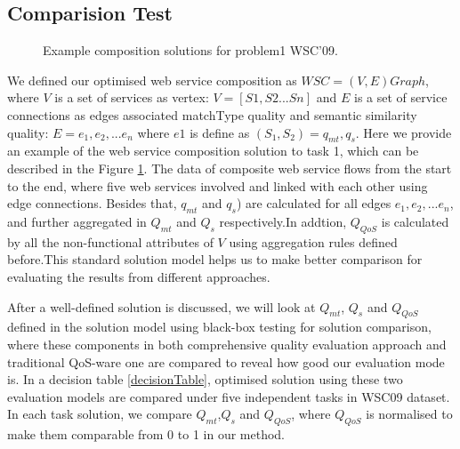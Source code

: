 \documentclass{llncs}
\begin{document}
\subsection{Comparision Test}\label{comparisionTest}
\begin{figure}[h]
\centerline{
}
 \caption{Example composition solutions for problem1 WSC'09.}
 \label{wscs}
\end{figure}
We defined our optimised web service composition as $WSC = (V, E)Graph$, where $V$ is a set of services as vertex: $V=[S1, S2...Sn]$ and $E$ is a set of service connections as edges associated matchType quality and semantic similarity quality: $E = {e_{1}, e_{2},... e_{n}}$ where $e1$ is define as $(S_{1},S_{2})={q_{mt}, q_{s}}$. Here we provide an example of the web service composition solution to task 1, which can be described in the Figure \ref{wscs}. The data of composite web service flows from the start to the end, where five web services involved and linked with each other using edge connections. Besides that, $q_{mt}$ and $q_{s}$) are calculated for all edges ${e_{1}, e_{2},... e_{n}}$, and further aggregated in $Q_{mt}$ and $Q_{s}$ respectively.In addtion, $Q_{QoS}$ is calculated by all the non-functional attributes of $V$ using aggregation rules defined before.This standard solution model helps us to make better comparison for evaluating the results from different approaches.

After a well-defined solution is discussed, we will look at $Q_{mt}$, $Q_{s}$ and $Q_{QoS}$ defined in the solution model using black-box testing for solution comparison, where these components in both comprehensive quality evaluation approach and traditional QoS-ware one \cite{feng2013dynamic,huang2009effective,ma2015hybrid,da2014graph} are compared to reveal how good our evaluation mode is. In a decision table \ref{decisionTable}, optimised solution using these two evaluation models are compared under five independent tasks in WSC09 dataset. In each task solution, we compare $Q_{mt}$,$Q_{s}$ and $Q_{QoS}$, where $Q_{QoS}$ is normalised to make them comparable from 0 to 1 in our method. 
\end{document}
